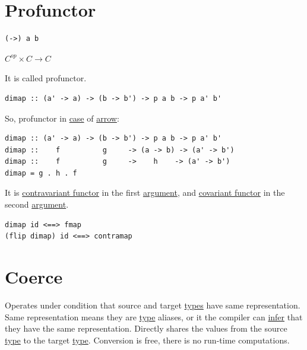 \documentclass[a4paper,14pt,oneside]{book}
\begin{document}
\chapter{Profunctor}
\label{sec:org4dedb33}

\begin{verbatim}
(->) a b
\end{verbatim}

\(C^{op} \times C \to C\)

It is called profunctor.

\begin{verbatim}
dimap :: (a' -> a) -> (b -> b') -> p a b -> p a' b'
\end{verbatim}

So, profunctor in \hyperref[orgd6cf54e]{case} of \hyperref[org55b33e1]{arrow}:


\begin{verbatim}
dimap :: (a' -> a) -> (b -> b') -> p a b -> p a' b'
dimap ::    f          g     -> (a -> b) -> (a' -> b') 
dimap ::    f          g     ->    h    -> (a' -> b')
dimap = g . h . f
\end{verbatim}

It is \hyperref[org7a0d2b4]{contravariant functor} in the first \hyperref[org98012e7]{argument}, and \hyperref[org66dcbff]{covariant functor} in the second \hyperref[org98012e7]{argument}.

\begin{verbatim}
dimap id <==> fmap
(flip dimap) id <==> contramap
\end{verbatim}

\chapter{Coerce}
\label{sec:org5336bdc}

Operates under condition that source and target \hyperref[org27ebdf4]{types} have same representation.
Same representation means they are \hyperref[org5b55790]{type} aliases, or it the compiler can \hyperref[orgc22870f]{infer} that they have the same representation. 
Directly shares the values from the source \hyperref[org5b55790]{type} to the target \hyperref[org5b55790]{type}.
Conversion is free, there is no run-time computations.
\end{document}
